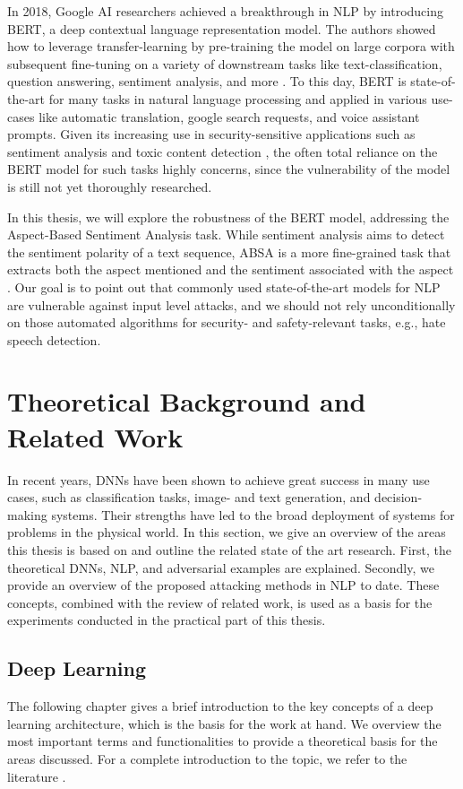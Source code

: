 In 2018, Google AI researchers achieved a breakthrough in NLP by introducing BERT, a deep contextual language representation model. The authors showed how to leverage transfer-learning by pre-training the model on large corpora with subsequent fine-tuning on a variety of downstream tasks like text-classification, question answering, sentiment analysis, and more \cite{devlin2018bert}. To this day, BERT is state-of-the-art for many tasks in natural language processing and applied in various use-cases like automatic translation, google search requests, and voice assistant prompts. 
Given its increasing use in security-sensitive applications such as sentiment analysis \cite{prabowo2009sentiment} and toxic content detection \cite{singhania20173han}, the often total reliance on the BERT model for such tasks highly concerns, since the vulnerability of the model is still not yet thoroughly researched.

In this thesis, we will explore the robustness of the BERT model, addressing the Aspect-Based Sentiment Analysis task. While sentiment analysis aims to detect the sentiment polarity of a text sequence, ABSA is a more fine-grained task that extracts both the aspect mentioned and the sentiment associated with the aspect \cite{pavlopoulos2014aspect}.
Our goal is to point out that commonly used state-of-the-art models for NLP are vulnerable against input level attacks, and we should not rely unconditionally on those automated algorithms for security- and safety-relevant tasks, e.g., hate speech detection.
\newpage

\section{Theoretical Background and Related Work}

In recent years, DNNs have been shown to achieve great success in many use cases, such as classification tasks, image- and text generation, and decision-making systems. Their strengths have led to the broad deployment of systems for problems in the physical world. 
In this section, we give an overview of the areas this thesis is based on and outline the related state of the art research. First, the theoretical DNNs, NLP, and adversarial examples are explained. Secondly, we provide an overview of the proposed attacking methods in NLP to date. These concepts, combined with the review of related work, is used as a basis for the experiments conducted in the practical part of this thesis. 
\subsection{Deep Learning}
The following chapter gives a brief introduction to the key concepts of a deep learning architecture, which is the basis for the work at hand. We overview the most important terms and functionalities to provide a theoretical basis for the areas discussed. For a complete introduction to the topic, we refer to the literature \cite{bengio2017deep}.


